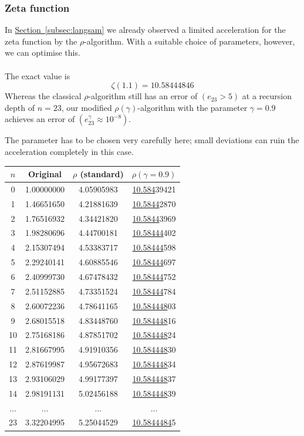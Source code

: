 \documentclass[a4paper,12pt]{article}
\numberwithin{equation}{section}
\newcommand{\secref}[1]{\hyperref[#1]{Section~\ref*{#1}}}
\theoremstyle{remark}
\begin{document}
\subsubsection*{Zeta function}
In \secref{subsec:langsam} we already observed a limited acceleration for the zeta function by the $\rho$-algorithm. With a suitable choice of parameters, however, we can optimise this.\\\\
The exact value is
\[
\zeta(1.1)=10.58444846
\]
Whereas the classical $\rho$-algorithm still has an error of $(e_{23}>5)$ at a recursion depth of $n=23$, our modified $\rho(\gamma)$-algorithm with the parameter $\gamma=0.9$ achieves an error of $(e_{23}^{\gamma}\approx10^{-8})$.

The parameter has to be chosen very carefully here; small deviations can ruin the acceleration completely in this case.\\
\begin{center}
\begin{tabular}{c|c|c|c}
$n$ & Original & $\rho$ (standard)& $\rho(\gamma=0.9)$ \\ \hline
0 & 1.00000000 & 4.05905983 & \underline{10.584}39421 \\
1 & 1.46651650 & 4.21881639 & \underline{10.5844}2870 \\
2 & 1.76516932 & 4.34421820 & \underline{10.5844}3969 \\
3 & 1.98280696 & 4.44700181 & \underline{10.58444}402 \\
4 & 2.15307494 & 4.53383717 & \underline{10.58444}598 \\
5 & 2.29240141 & 4.60885546 & \underline{10.58444}697 \\
6 & 2.40999730 & 4.67478432 & \underline{10.58444}752 \\
7 & 2.51152885 & 4.73351524 & \underline{10.58444}784 \\
8 & 2.60072236 & 4.78641165 & \underline{10.584448}03 \\
9 & 2.68015518 & 4.83448760 & \underline{10.584448}16 \\
10 & 2.75168186 & 4.87851702 & \underline{10.584448}24 \\
11 & 2.81667995 & 4.91910356 & \underline{10.584448}30\\
12 & 2.87619987 & 4.95672683 & \underline{10.584448}34 \\
13 & 2.93106029 & 4.99177397 & \underline{10.584448}37 \\
14 & 2.98191131 & 5.02456188 & \underline{10.584448}39 \\
... & ... & ... & ... \\
23 & 3.32204995 & 5.25044529 & \underline{10.5844484}5
\end{tabular}
\end{center}
\end{document}
